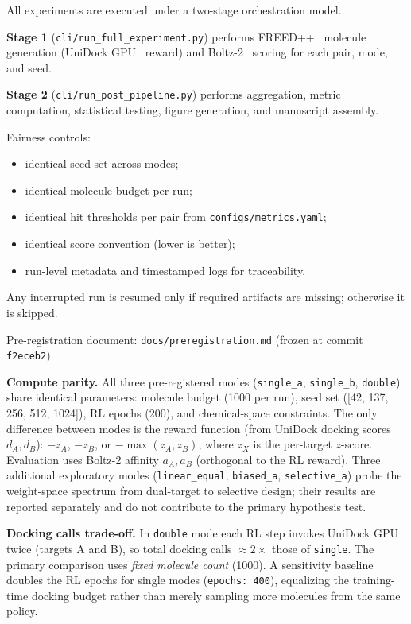 All experiments are executed under a two-stage orchestration model.

\textbf{Stage 1} (\texttt{cli/run\_full\_experiment.py}) performs
FREED++~\citep{telepov2023freedpp} molecule generation (UniDock
GPU~\citep{yu2023unidock} reward) and Boltz-2~\citep{passaro2025boltz2}
scoring for each pair, mode, and seed.

\textbf{Stage 2} (\texttt{cli/run\_post\_pipeline.py}) performs aggregation,
metric computation, statistical testing, figure generation, and manuscript assembly.

Fairness controls:
\begin{itemize}
\item identical seed set across modes;
\item identical molecule budget per run;
\item identical hit thresholds per pair from \texttt{configs/metrics.yaml};
\item identical score convention (lower is better);
\item run-level metadata and timestamped logs for traceability.
\end{itemize}

Any interrupted run is resumed only if required artifacts are missing; otherwise it is skipped.

Pre-registration document: \texttt{docs/preregistration.md} (frozen at commit \texttt{f2eceb2}).

\textbf{Compute parity.} All three pre-registered modes (\texttt{single\_a},
\texttt{single\_b}, \texttt{double}) share identical parameters: molecule
budget (1000 per run), seed set ([42, 137, 256, 512, 1024]), RL epochs (200),
and chemical-space constraints.  The only difference between modes is the reward
function (from UniDock docking scores $d_A, d_B$): $-z_A$, $-z_B$, or
$-\max(z_A, z_B)$, where $z_X$ is the per-target $z$-score.
Evaluation uses Boltz-2 affinity $a_A, a_B$ (orthogonal to the RL reward).
Three additional exploratory modes (\texttt{linear\_equal},
\texttt{biased\_a}, \texttt{selective\_a}) probe the weight-space
spectrum from dual-target to selective design; their results are
reported separately and do not contribute to the primary hypothesis test.

\textbf{Docking calls trade-off.} In \texttt{double} mode each RL step invokes
UniDock GPU twice (targets A and B), so total docking calls $\approx 2\times$
those of \texttt{single}.  The primary comparison uses \emph{fixed molecule count}
(1000).  A sensitivity baseline doubles the RL epochs for single modes
(\texttt{epochs: 400}), equalizing the training-time docking budget rather
than merely sampling more molecules from the same policy.

